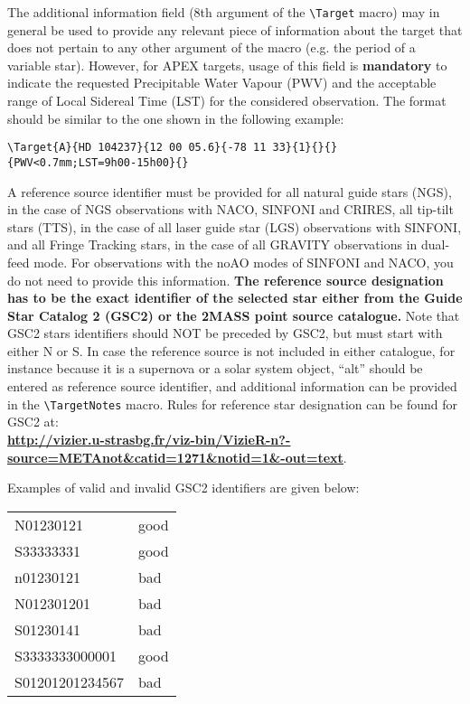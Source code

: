 \documentclass{article}
\begin{document}
The additional information field (8th argument of the \verb|\Target|
macro) may in general be used to provide any relevant piece of
information about the target that does not pertain to any other
argument of the macro (e.g. the period of a variable star). However,
for APEX targets, usage of this field is {\bf mandatory} to indicate the
requested Precipitable Water Vapour (PWV) and the acceptable range of
Local Sidereal Time (LST) for the considered observation. The format
should be similar to the one shown in the following example:
\begin{verbatim}
\Target{A}{HD 104237}{12 00 05.6}{-78 11 33}{1}{}{}{PWV<0.7mm;LST=9h00-15h00}{}
\end{verbatim}

A reference source identifier must be provided for all natural guide 
stars (NGS), in the case of NGS observations with NACO, SINFONI and CRIRES, 
all tip-tilt stars (TTS), in the case of all laser guide star (LGS)
observations with SINFONI, and all Fringe Tracking stars, in the case
of all GRAVITY observations in dual-feed mode.
For observations with the noAO modes of SINFONI and NACO,
you do not need to provide this information.  {\bf The reference source
  designation has to be the exact identifier of the selected star
  either 
  from the Guide Star Catalog 2 (GSC2) or the 2MASS point source
  catalogue.} Note that GSC2 stars identifiers should NOT be preceded
by GSC2, 
but must start with either N or S. In case the reference source is not
included in either catalogue, for instance because it is a supernova or
a solar system object, ``alt'' should be entered as reference source
identifier, and additional information can be provided in the
\verb|\TargetNotes| macro.
Rules for reference star designation can be found for GSC2 at:\\
  \href{http://vizier.u-strasbg.fr/viz-bin/VizieR-n?-source=METAnot&catid=1271&notid=1&-out=text}{\bf
    \underline{http://vizier.u-strasbg.fr/viz-bin/VizieR-n?-source=METAnot\&catid=1271\&notid=1\&-out=text}}. 

\smallskip

Examples of valid and invalid GSC2 identifiers are given below:

\begin{center}
\begin{tabular}{ll}
    N01230121           & good\\
    S33333331           & good\\
    n01230121           & bad\\
    N012301201          & bad\\
    S01230141           & bad\\
    S3333333000001      & good\\
    S01201201234567     & bad\\
\end{tabular}
\end{center}
\end{document}
